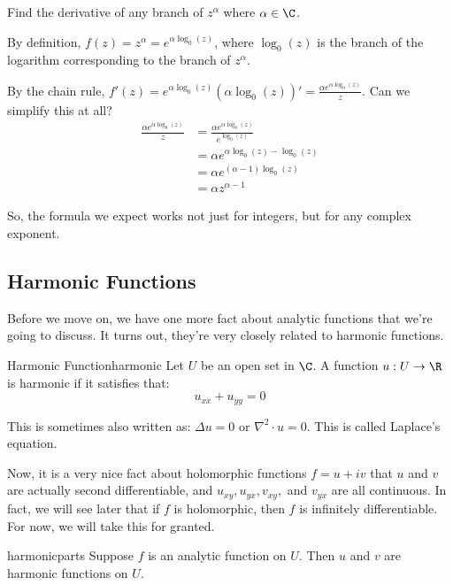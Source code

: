 \begin{ex}{}{} Find the derivative of any branch of $z^{\alpha}$ where $\alpha\in \C$.

By definition, $f(z) = z^{\alpha} = e^{\alpha\log_0(z)}$, where $\log_0(z)$ is the branch of the logarithm corresponding to the branch of $z^{\alpha}$.

By the chain rule, $f'(z) = e^{\alpha \log_0(z)} (\alpha\log_0(z))' = \frac{\alpha e^{\alpha\log_0(z)}}{z}$. Can we simplify this at all?
\begin{align*}\frac{\alpha e^{\alpha\log_0(z)}}{z} &= \frac{\alpha e^{\alpha \log_0(z)}}{e^{\log_0(z)}}\\
&= \alpha e^{\alpha \log_0(z) - \log_0(z)}\\
&= \alpha e^{(\alpha - 1)\log_0(z)}\\
&=\alpha z^{\alpha-1}
\end{align*}

So, the formula we expect works not just for integers, but for any complex exponent.
\end{ex}

\subsection{Harmonic Functions}

Before we move on, we have one more fact about analytic functions that we're going to discuss. It turns out, they're very closely related to harmonic functions.



\begin{defbo}{Harmonic Function}{harmonic}
Let $U$ be an open set in $\C$. A function $u:U\rightarrow \R$ is harmonic if it satisfies that:
$$u_{xx} + u_{yy} =0$$

This is sometimes also written as: $\Delta u = 0$ or $\nabla^2\cdot u = 0$. This is called Laplace's equation.
\end{defbo}

Now, it is a very nice fact about holomorphic functions $f = u + iv$ that $u$ and $v$ are actually second differentiable, and $u_{xy}, u_{yx}, v_{xy},$ and $v_{yx}$ are all continuous. In fact, we will see later that if $f$ is holomorphic, then $f$ is infinitely differentiable. For now, we will take this for granted.

\begin{thmbo}{}{harmonicparts} Suppose $f$ is an analytic function on $U$. Then $u$ and $v$ are harmonic functions on $U$.\end{thmbo}

